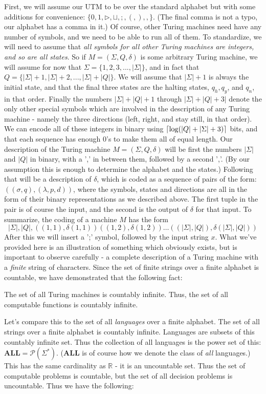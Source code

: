 First, we will assume our UTM to be over the standard alphabet but with some additions for convenience: $\{0,1,\triangleright, \sqcup,;,(,),,\}$. (The final comma is not a typo, our alphabet has a comma in it.) Of course, other Turing machines need have any number of symbols, and we need to be able to run all of them. To standardize, we will need to assume that \textit{all symbols for all other Turing machines are integers, and so are all states}.  So if $M = (\Sigma,Q,\delta)$ is some arbitrary Turing machine, we will assume for now that $\Sigma = \{1,2,3,...,|\Sigma|\}$, and in fact that $Q = \{|\Sigma|+1,|\Sigma|+2,...,|\Sigma|+|Q|\}$. We will assume that $|\Sigma|+1$ is always the initial state, and that the final three states are the halting states, $q_h,q_y$, and $q_n$, in that order. Finally the numbers $|\Sigma|+|Q|+1$ through $|\Sigma|+|Q|+3|$ denote the only other special symbols which are involved in the description of any Turing machine - namely the three directions (left, right, and stay still, in that order). We can encode all of these integers in binary using $\lceil\log(|Q|+|\Sigma|+3)\rceil$ bits, and that each sequence has enough $0$'s to make them all of equal length. Our description of the Turing machine $M = (\Sigma,Q,\delta)$ will be first the numbers $|\Sigma|$ and $|Q|$ in binary, with a ',' in between them, followed by a second ','. (By our assumption this is enough to determine the alphabet and the states.) Following that will be a description of $\delta$, which is coded as a sequence of pairs of the form: $((\sigma,q),(\lambda,p,d))$, where the symbols, states and directions are all in the form of their binary representations as we described above. The first tuple in the pair is of course the input, and the second is the output of $\delta$ for that input. To summarize, the coding of a machine $M$ has the form 
\[ |\Sigma|,|Q|,((1,1),\delta(1,1))((1,2),\delta(1,2))\ldots ((|\Sigma|,|Q|),\delta(|\Sigma|,|Q|)) \]
After this we will insert a ';' symbol, followed by the input string $x$. What we've provided here is an illustration of something which obviously exists, but is important to observe carefully - a complete description of a Turing machine with a \textit{finite} string of characters. Since the set of finite strings over a finite alphabet is countable, we have demonstrated that the following fact:
\begin{fact}
	The set of all Turing machines is countably infinite. Thus, the set of all computable functions is countably infinite.
\end{fact}
Let's compare this to the set of all \textit{languages} over a finite alphabet. The set of all strings over a finite alphabet is countably infinite. Languages are subsets of this countably infinite set. Thus the collection of all languages is the power set of this: $\bm{ALL} = \mathcal{P}(\Sigma^*)$. ($\bm{ALL}$ is of course how we denote the class of \textit{all} languages.) This has the same cardinality as $\mathbb{R}$ - it is an uncountable set. Thus the set of computable problems is countable, but the set of all decision problems is uncountable. Thus we have the following:
